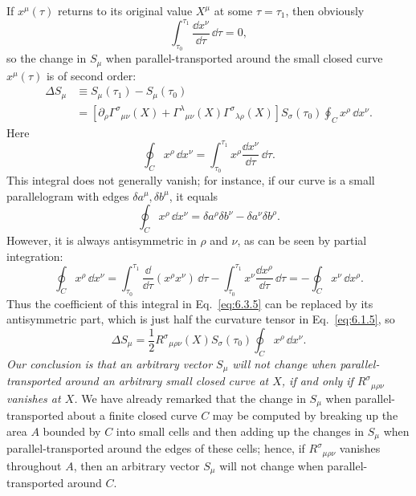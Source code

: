 If \(x^\mu(\tau)\) returns to its original value \(X^\mu\) at some
\(\tau=\tau_1\), then obviously
\[
  \int_{\tau_0}^{\tau_1}
  \frac{\dd x^\nu}{\dd\tau}\,\dd\tau=0,
\]
so the change in \(S_\mu\) when parallel-transported around the small closed
curve \(x^\mu(\tau)\) is of second order:
\begin{equation}
  \begin{split}
  \Delta S_\mu
  &\equiv S_\mu(\tau_1)-S_\mu(\tau_0)
  \\
  &=
  \left[
    \partial_\rho\Gamma^\sigma{}_{\mu\nu}(X)
    +\Gamma^\lambda{}_{\mu\nu}(X)
     \Gamma^\sigma{}_{\lambda\rho}(X)
  \right]S_\sigma(\tau_0)
  \oint_C x^\rho\,\dd x^\nu.
  \end{split}
  \tag{6.3.5}\label{eq:6.3.5}
\end{equation}
Here
\[
  \oint_C x^\rho\,\dd x^\nu
  =
  \int_{\tau_0}^{\tau_1}
  x^\rho\frac{\dd x^\nu}{\dd\tau}\,\dd\tau.
\]
This integral does not generally vanish; for instance, if our curve is a
small parallelogram with edges \(\delta a^\mu,\delta b^\mu\), it equals
\[
  \oint_C x^\rho\,\dd x^\nu
  =
  \delta a^\rho\delta b^\nu-\delta a^\nu\delta b^\rho.
\]
However, it is always antisymmetric in \(\rho\) and \(\nu\), as can be seen by
partial integration:
\begin{equation}
  \oint_C x^\rho\,\dd x^\nu
  =
  \int_{\tau_0}^{\tau_1}
  \frac{\dd}{\dd\tau}(x^\rho x^\nu)\,\dd\tau
  -
  \int_{\tau_0}^{\tau_1}
  x^\nu\frac{\dd x^\rho}{\dd\tau}\,\dd\tau
  =
  -\oint_C x^\nu\,\dd x^\rho.
  \tag{6.3.6}\label{eq:6.3.6}
\end{equation}
Thus the coefficient of this integral in Eq.~\eqref{eq:6.3.5} can be
replaced by its antisymmetric part, which is just half the curvature tensor
in Eq.~\eqref{eq:6.1.5}, so
\begin{equation}
  \Delta S_\mu
  =
  \frac12
  R^\sigma{}_{\mu\rho\nu}(X)S_\sigma(\tau_0)
  \oint_C x^\rho\,\dd x^\nu.
  \tag{6.3.7}\label{eq:6.3.7}
\end{equation}
\emph{Our conclusion is that an arbitrary vector \(S_\mu\) will not change
when parallel-transported around an arbitrary small closed curve at \(X\), if
and only if \(R^\sigma{}_{\mu\rho\nu}\) vanishes at \(X\).} We have already
remarked that the change in \(S_\mu\) when parallel-transported about a finite
closed curve \(C\) may be computed by breaking up the area \(A\) bounded by
\(C\) into small cells and then adding up the changes in \(S_\mu\) when
parallel-transported around the edges of these cells; hence, if
\(R^\sigma{}_{\mu\rho\nu}\) vanishes throughout \(A\), then an arbitrary
vector \(S_\mu\) will not change when parallel-transported around \(C\).

